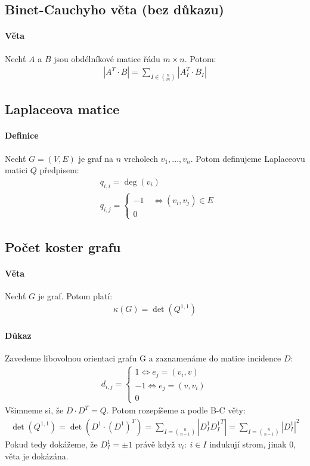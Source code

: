 \documentclass[a4paper,10pt]{article}
\begin{document}
\subsection{Binet-Cauchyho věta (bez důkazu)}
\setcounter{equation}{0}
\paragraph{Věta}
Nechť $A$ a $B$ jsou obdélníkové matice řádu $m \times n$. Potom:
\begin{align*}
	|A^T \cdot B| = \sum_{I \in \binom{n}{m}} |A^T_I \cdot B_I|
\end{align*}


\subsection{Laplaceova matice}
\setcounter{equation}{0}
\paragraph{Definice}
Nechť $G = (V,E)$ je graf na $n$ vrcholech $v_1, ..., v_n$. Potom definujeme Laplaceovu matici
$Q$ předpisem:
\begin{align*}
	&q_{i,i} = \deg(v_i) \\
	&q_{i,j} =
		\begin{cases}
			-1 \quad \Leftrightarrow (v_i,v_j) \in E \\
			0
		\end{cases}
\end{align*}

\subsection{Počet koster grafu}
\setcounter{equation}{0}
\paragraph{Věta}
Nechť $G$ je graf. Potom platí:
\begin{align*}
	\kappa(G) = \det(Q^{1,1})
\end{align*}
\paragraph{Důkaz}
Zavedeme libovolnou orientaci grafu G a zaznamenáme do matice incidence $D$:
\begin{align}
	d_{i,j} = \begin{cases}
		1 \Leftrightarrow e_j = (v_i, v) \\
		-1 \Leftrightarrow e_j = (v, v_i) \\
		0
	\end{cases}
\end{align}
Všimneme si, že $D \cdot D^T = Q$. Potom rozepíšeme a podle B-C věty:
\begin{align}
	\det(Q^{1,1}) = \det(D^1 \cdot (D^1)^T) = \sum_{I=\binom{n}{n-1}} |D_I^1
	{D_I^1}^T| = \sum_{I=\binom{n}{n-1}} |D_I^1|^2
\end{align}
Pokud tedy dokážeme, že $D_I^1 = \pm 1$ právě když $v_i:\ i \in I$ indukují
strom, jinak 0, věta je dokázána.
\end{document}
